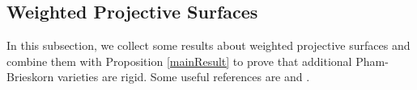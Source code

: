 \documentclass[12pt]{amsart}
\theoremstyle{plain}
\theoremstyle{definition}
\begin{document}
\subsection{Weighted Projective Surfaces} 
		
In this subsection, we collect some results about weighted projective surfaces and combine them with Proposition \ref{mainResult} to prove that additional Pham-Brieskorn varieties are rigid. Some useful references are \cite{iano-fletcher_2000} and \cite{dolgachev}.	
        








\end{document}

